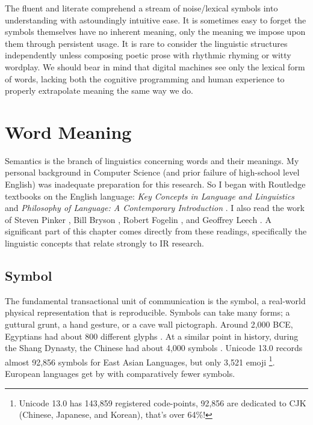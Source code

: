 The fluent and literate comprehend a stream of noise\slash lexical symbols into understanding with astoundingly intuitive ease. It is sometimes easy to forget the symbols themselves have no inherent meaning, only the meaning we impose upon them through persistent usage. It is rare to consider the linguistic structures independently unless composing poetic prose with rhythmic rhyming or witty wordplay. We should bear in mind that digital machines see only the lexical form of words, lacking both the cognitive programming and human experience to properly extrapolate meaning the same way we do.






\section{Word Meaning}

Semantics is the branch of linguistics concerning words and their meanings. My personal background in Computer Science (and prior failure of high-school level English) was inadequate preparation for this research. So I began with Routledge textbooks on the English language: \textit{Key Concepts in Language and Linguistics} \cite{trask1999key} and \textit{Philosophy of Language: A Contemporary Introduction} \cite{lycan2018philosophy}. I also read the work of Steven Pinker \cite{pinker2003language, pinker2007stuff, pinker2015words}, Bill Bryson \cite{bryson1990mother}, Robert Fogelin \cite{fogelin2011figuratively}, and Geoffrey Leech \cite{leech2014linguistic}. A significant part of this chapter comes directly from these readings, specifically the linguistic concepts that relate strongly to IR research.

\subsection{Symbol}

The fundamental transactional unit of communication is the symbol, a real-world physical representation that is reproducible. Symbols can take many forms; a guttural grunt, a hand gesture, or a cave wall pictograph. Around 2,000 BCE, Egyptians had about 800 different glyphs \cite{loprieno1995ancient}. At a similar point in history, during the Shang Dynasty, the Chinese had about 4,000 symbols \cite{baxter2014old}. Unicode 13.0 records almost 92,856 symbols for East Asian Languages, but only 3,521 emoji \cite{unicode13}\footnote{Unicode 13.0 has 143,859 registered code-points, 92,856 are dedicated to CJK (Chinese, Japanese, and Korean), that's over 64\%!}. European languages get by with comparatively fewer symbols.

